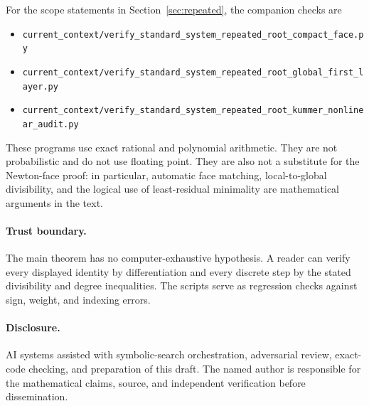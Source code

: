 \documentclass[11pt]{article}
\theoremstyle{definition}
\theoremstyle{remark}
\begin{document}
For the scope statements in Section~\ref{sec:repeated}, the companion
checks are
\begingroup\footnotesize
\begin{itemize}
\item \nolinkurl{current_context/verify_standard_system_repeated_root_compact_face.py}
\item \nolinkurl{current_context/verify_standard_system_repeated_root_global_first_layer.py}
\item \nolinkurl{current_context/verify_standard_system_repeated_root_kummer_nonlinear_audit.py}
\end{itemize}
\endgroup
These programs use exact rational and polynomial arithmetic.  They are
not probabilistic and do not use floating point.  They are also not a
substitute for the Newton-face proof: in particular, automatic face
matching, local-to-global divisibility, and the logical use of
least-residual minimality are mathematical arguments in the text.

\paragraph{Trust boundary.}
The main theorem has no computer-exhaustive hypothesis.  A reader can
verify every displayed identity by differentiation and every discrete
step by the stated divisibility and degree inequalities.  The scripts
serve as regression checks against sign, weight, and indexing errors.

\paragraph{Disclosure.}
AI systems assisted with symbolic-search orchestration, adversarial
review, exact-code checking, and preparation of this draft.  The named
author is responsible for the mathematical claims, source, and
independent verification before dissemination.
\end{document}
